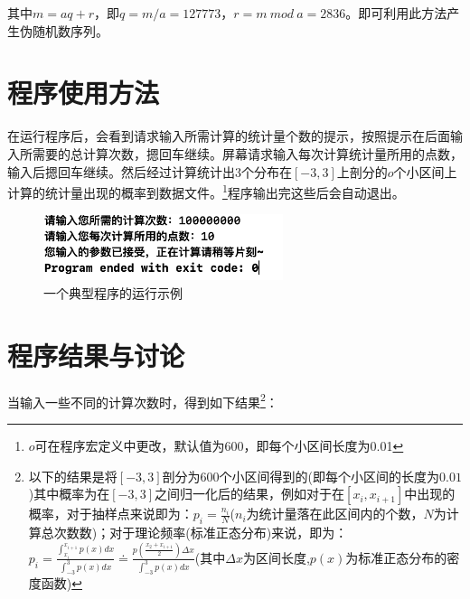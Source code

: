 \documentclass[a4paper,11pt]{article}
\begin{document}
其中$m=aq+r$，即$q=m/a=127773$，$r=m \ mod \ a=2836$。即可利用此方法产生伪随机数序列。



\section{程序使用方法}
在运行程序后，会看到请求输入所需计算的统计量个数的提示，按照提示在后面输入所需要的总计算次数，摁回车继续。屏幕请求输入每次计算统计量所用的点数，输入后摁回车继续。然后经过计算统计出3个分布在$[-3,3]$上剖分的$o$个小区间上计算的统计量出现的概率到数据文件。\footnote{$o$可在程序宏定义中更改，默认值为600，即每个小区间长度为0.01}程序输出完这些后会自动退出。

\begin{figure}[!htbp]        
\centering
\includegraphics[width=7cm]{example.png}      
\caption{ 一个典型程序的运行示例}      
\end{figure}


\section{程序结果与讨论}
当输入一些不同的计算次数时，得到如下结果\footnote{以下的结果是将$[-3,3]$剖分为600个小区间得到的(即每个小区间的长度为$0.01$)其中概率为在$[-3,3]$之间归一化后的结果，例如对于在$[x_{i},x_{i+1}]$中出现的概率，对于抽样点来说即为：$p_{i} = \frac{n_{i}}{N}$($n_{i}$为统计量落在此区间内的个数，$N$为计算总次数数)；对于理论频率(标准正态分布)来说，即为：$p_{i} = \frac{ \int_{x_{i}}^{x_{i+1}}p(x)dx }{ \int_{-3}^{3}p(x)dx } \doteq \frac{ p(\frac{x_{2}+x_{i+1}}{2})\Delta x }{ \int_{-3}^{3}p(x)dx }$(其中$\Delta x$为区间长度,$p(x)$为标准正态分布的密度函数)}：
\end{document}
